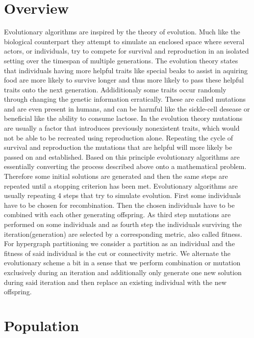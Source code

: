 \documentclass[a4paper,12pt,titlepage, BCOR7mm,headsepline]{scrbook}
\numberwithin{equation}{section}
\begin{document}
\section{Overview}
Evolutionary algorithms are inspired by the theory of evolution. Much like the biological counterpart they attempt to simulate 
an enclosed space where several actors, or individuals, try to compete for survival and reproduction in an isolated setting over the timespan of multiple generations.
The evolution theory states that individuals having more helpful traits like special beaks to assist in aquiring food are more likely to survive longer and 
thus more likely to pass these helpful traits onto the next generation. Addiditionaly some traits occur randomly through changing the genetic information erratically. These are called mutations and are even present in humans, and can be harmful like the sickle-cell desease or beneficial like the ability to consume lactose. In the evolution theory mutations 
are usually a factor that introduces previously nonexistent traits, which would not be able to be recreated using reproduction alone. Repeating the cycle of survival and reproduction the mutations that are helpful will more likely be passed on and established. Based on this principle evolutionary algorithms are essentially converting the process described above onto a mathematical problem.
Therefore some initial solutions are generated and then the same steps are repeated until a stopping criterion has been met.
Evolutionary algorithms are usually repeating 4 steps that try to simulate evolution. First some individuals have to be chosen for recombination. Then the chosen individuals have to be combined with each other generating offspring. As third step mutations are performed on some individuals and as fourth step the individuals surviving the iteration(generation) are selected by a corresponding metric, also called fitness. For hypergraph partitioning we consider a partition as an individual and the fitness of said individual is the cut or connectivity metric. We alternate the evolutionary scheme a bit in a sense that we perform combination or mutation exclusively during an iteration and additionally only generate one new solution during said iteration and then replace an existing individual with the new offspring. 

\section{Population}
\end{document}
